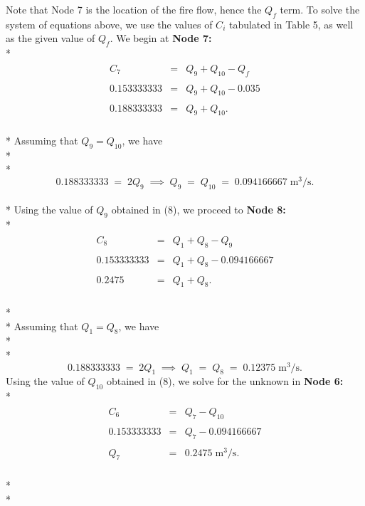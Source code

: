 \documentclass[]{article}
\begin{document}
Note that Node 7 is the location of the fire flow, hence the $Q_f$ term. To solve the system of equations above, we use the values of $C_i$ tabulated in Table 5, as well as the given value of $Q_f$. We begin at \textbf{Node 7:} \\*
\begin{align}
\nonumber
\begin{array}{rcl}
C_7 &=& Q_9+Q_{10} - Q_f \\ \\
0.153333333 &=& Q_9+Q_{10} - 0.035 \\ \\ 
0.188333333 &=& Q_9+Q_{10}.
\end{array} 
\end{align} \\* 
Assuming that $Q_9 = Q_{10}$, we have \\* \\* 
\begin{equation}
0.188333333 \; = \; 2Q_9 \; \implies \; Q_9 \; = \; Q_{10} \; = \; 0.094166667 \; \text{m}^3/\text{s}.
\end{equation} \\* 
Using the value of $Q_9$ obtained in (8), we proceed to \textbf{Node 8:} \\* 
\begin{align}
\nonumber
\begin{array}{rcl}
C_8 &=& Q_1+Q_{8} - Q_9 \\ \\
0.153333333 &=&  Q_1 +Q_{8} - 0.094166667  \\ \\ 
0.2475 &=& Q_1+Q_{8}.
\end{array} 
\end{align} \\* \\* 
Assuming that $Q_1 = Q_{8}$, we have \\* \\*
\begin{equation}
0.188333333 \; = \; 2Q_1 \; \implies \; Q_1 \; = \; Q_{8} \; = \; 0.12375
 \; \text{m}^3/\text{s}.
\end{equation} 
\newpage
\noindent Using the value of $Q_{10}$ obtained in (8), we solve for the unknown in \textbf{Node 6:} \\*
\begin{align}
\begin{array}{rcl}
C_6 &=& Q_7-Q_{10} \\ \\
0.153333333 &=&  Q_7 - 0.094166667  \\ \\ 
Q_7 &=& 0.2475 \; \text{m}^3/\text{s}.
\end{array} 
\end{align} \\* \\*
\end{document}

